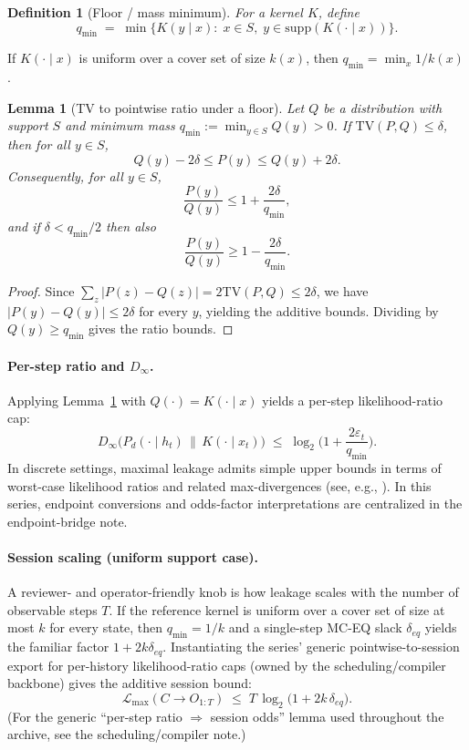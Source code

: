 \documentclass[11pt]{article}
\newtheorem{definition}{Definition}
\newtheorem{lemma}{Lemma}
\newcommand{\TV}{\mathrm{TV}}
\newcommand{\eps}{\varepsilon}
\newcommand{\logtwo}{\log_2}
\begin{document}
\begin{definition}[Floor / mass minimum]
For a kernel $K$, define
\[
q_{\min}\;=\;\min\{K(y\mid x):\; x\in S,\; y\in \mathrm{supp}(K(\cdot\mid x))\}.
\]
\end{definition}
If $K(\cdot\mid x)$ is uniform over a cover set of size $k(x)$, then $q_{\min}=\min_x 1/k(x)$.

\begin{lemma}[TV to pointwise ratio under a floor]
\label{lem:tv-to-ratio}
Let $Q$ be a distribution with support $S$ and minimum mass $q_{\min}:=\min_{y\in S}Q(y)>0$.
If $\TV(P,Q)\le \delta$, then for all $y\in S$,
\[
Q(y)-2\delta \le P(y) \le Q(y)+2\delta.
\]
Consequently, for all $y\in S$,
\[
\frac{P(y)}{Q(y)}\le 1+\frac{2\delta}{q_{\min}},
\]
and if $\delta<q_{\min}/2$ then also
\[
\frac{P(y)}{Q(y)}\ge 1-\frac{2\delta}{q_{\min}}.
\]
\end{lemma}

\begin{proof}
Since $\sum_{z}|P(z)-Q(z)|=2\TV(P,Q)\le 2\delta$, we have $|P(y)-Q(y)|\le 2\delta$ for every $y$, yielding the additive bounds.
Dividing by $Q(y)\ge q_{\min}$ gives the ratio bounds.
\end{proof}

\paragraph{Per-step ratio and $D_\infty$.}
Applying Lemma~\ref{lem:tv-to-ratio} with $Q(\cdot)=K(\cdot\mid x)$ yields a per-step likelihood-ratio cap:
\[
D_\infty\!\big(P_d(\cdot\mid h_t)\,\|\,K(\cdot\mid x_t)\big)\;\le\;\logtwo\!\Big(1+\frac{2\eps_t}{q_{\min}}\Big).
\]
In discrete settings, maximal leakage admits simple upper bounds in terms of worst-case likelihood ratios and related max-divergences (see, e.g., \cite{issa_maxleak}).
In this series, endpoint conversions and odds-factor interpretations are centralized in the endpoint-bridge note.\cite{series:endpointbridge}

\paragraph{Session scaling (uniform support case).}
A reviewer- and operator-friendly knob is how leakage scales with the number of observable steps $T$.
If the reference kernel is uniform over a cover set of size at most $k$ for every state, then $q_{\min}=1/k$ and a single-step MC-EQ slack $\delta_{eq}$ yields the familiar factor $1+2k\delta_{eq}$.
Instantiating the series' generic pointwise-to-session export for per-history likelihood-ratio caps (owned by the scheduling/compiler backbone) gives the additive session bound:
\[
\mathcal{L}_{\max}(C\to O_{1:T}) \;\le\; T\,\log_2\!\Big(1+2k\,\delta_{eq}\Big).
\]
(For the generic ``per-step ratio $\Rightarrow$ session odds'' lemma used throughout the archive, see the scheduling/compiler note.\cite{series:schedcompiler})
\end{document}
